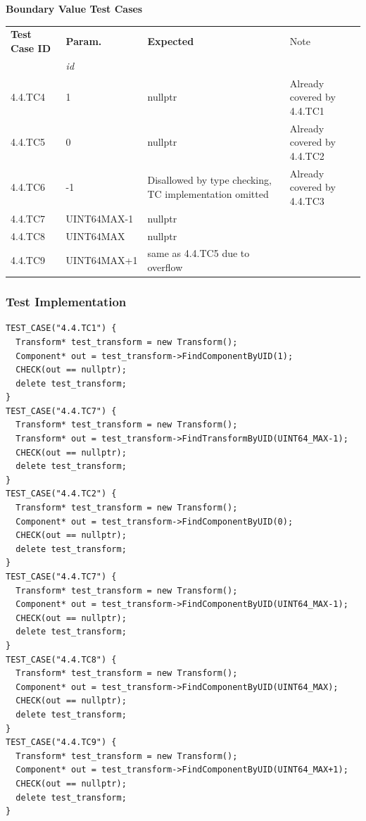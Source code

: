 \documentclass[11pt]{article}
\begin{document}
\textbf{Boundary Value Test Cases}
\begin{center}
\begin{tabularx}{\textwidth}{lXXX}
\hline
\textbf{Test Case ID} & \textbf{Param.} & \textbf{Expected} & Note\\
 & \textit{id} &  & \\
\hline
4.4.TC4 & 1 & nullptr & Already covered by 4.4.TC1\\
\hline
4.4.TC5 & 0 & nullptr & Already covered by 4.4.TC2\\
\hline
4.4.TC6 & -1 & Disallowed by type checking, TC implementation omitted & Already covered by 4.4.TC3\\
\hline
4.4.TC7 & UINT64\textunderscore{}MAX-1 & nullptr & \\
\hline
4.4.TC8 & UINT64\textunderscore{}MAX & nullptr & \\
\hline
4.4.TC9 & UINT64\textunderscore{}MAX+1 & same as 4.4.TC5 due to overflow & \\
\hline
\end{tabularx}
\end{center}

\clearpage
\subsubsection*{Test Implementation}
\label{sec:orgcc26917}
\begin{verbatim}
TEST_CASE("4.4.TC1") {
  Transform* test_transform = new Transform();
  Component* out = test_transform->FindComponentByUID(1);
  CHECK(out == nullptr);
  delete test_transform;
}
TEST_CASE("4.4.TC7") {
  Transform* test_transform = new Transform();
  Transform* out = test_transform->FindTransformByUID(UINT64_MAX-1);
  CHECK(out == nullptr);
  delete test_transform;
}
TEST_CASE("4.4.TC2") {
  Transform* test_transform = new Transform();
  Component* out = test_transform->FindComponentByUID(0);
  CHECK(out == nullptr);
  delete test_transform;
}
TEST_CASE("4.4.TC7") {
  Transform* test_transform = new Transform();
  Component* out = test_transform->FindComponentByUID(UINT64_MAX-1);
  CHECK(out == nullptr);
  delete test_transform;
}
TEST_CASE("4.4.TC8") {
  Transform* test_transform = new Transform();
  Component* out = test_transform->FindComponentByUID(UINT64_MAX);
  CHECK(out == nullptr);
  delete test_transform;
}
TEST_CASE("4.4.TC9") {
  Transform* test_transform = new Transform();
  Component* out = test_transform->FindComponentByUID(UINT64_MAX+1);
  CHECK(out == nullptr);
  delete test_transform;
}
\end{verbatim}
\end{document}
